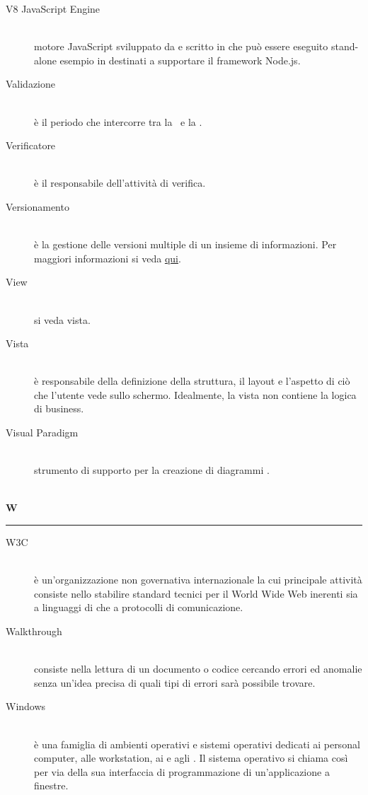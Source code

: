 \documentclass[12pt,a4paper]{article}
\begin{document}
\begin{description}
\item[V8 JavaScript Engine] 
\hfill\\motore JavaScript  sviluppato da  e scritto in  che  può essere eseguito stand-alone esempio in  destinati a supportare il framework Node.js.

\item[Validazione] 
\hfill\\è il periodo che intercorre tra la \RQ\ e la \RA.

\item[Verificatore] 
\hfill\\è il responsabile dell'attività di verifica.

\item[Versionamento] 
\hfill\\è la gestione delle versioni multiple di un insieme di informazioni. Per maggiori informazioni si veda \href{http://it. wikipedia.org/wiki/Controllo_versione}{qui}.

\item[View] 
\hfill\\si veda vista.

\item[Vista] 
\hfill\\è responsabile della definizione della struttura, il layout e l'aspetto di ciò che l'utente vede sullo schermo. Idealmente, la vista non contiene la logica di business.

\item[Visual Paradigm] 
\hfill\\strumento di supporto per la creazione di diagrammi .
\end{description}

\newpage

\begin{center}
\hfill\\
	\LARGE \textbf{W}
\hfill\\
\rule[15pt]{30pt}{0.5pt}
\end{center}

\begin{description}
\item[W3C] 
\hfill\\è un'organizzazione non governativa internazionale la cui principale attività  consiste nello stabilire standard tecnici per il World Wide Web inerenti sia a linguaggi di  che a protocolli di comunicazione.

\item[Walkthrough] 
\hfill\\consiste nella lettura di un documento o codice cercando errori ed anomalie senza un'idea precisa di quali tipi di errori sarà possibile trovare.

\item[Windows] 
\hfill\\è una famiglia di ambienti operativi e sistemi operativi dedicati ai personal computer, alle workstation, ai  e agli . Il sistema operativo si chiama così per via della sua interfaccia di programmazione di un'applicazione a finestre.
\end{description}
\end{document}
